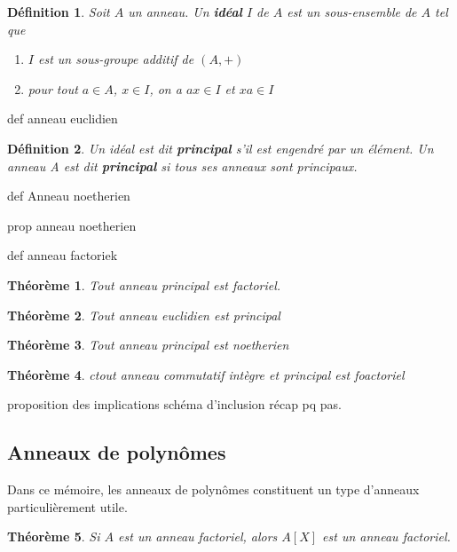 \documentclass[a4paper,12pt]{report}  %
\theoremstyle{definitionstyle}
\newtheorem{definition}{Définition}[chapter] %
\theoremstyle{examplestyle}
\theoremstyle{remarkstyle}
\theoremstyle{propositionstyle}
\theoremstyle{theoremstyle}
\newtheorem{theoreme}{Théorème}[chapter]  %
\theoremstyle{proofstyle}
\begin{document}
	\begin{definition}
		Soit $A$ un anneau. Un \textbf{idéal} $I$ de $A$ est un sous-ensemble de $A$ tel que
		\begin{enumerate}
			\item $I$ est un sous-groupe additif de $(A, +)$
			\item pour tout $a \in A$, $x \in I$, on a $ax \in I$ et $xa \in I$
		\end{enumerate}
	\end{definition}

	def anneau euclidien
	
	\begin{definition}
		Un idéal est dit \textbf{principal} s'il est engendré par un élément. Un anneau A est dit \textbf{principal} si tous ses anneaux sont principaux.
	\end{definition} 
	
		

	def Anneau noetherien
	
	prop anneau noetherien
	
	
	def anneau factoriek
	
	\begin{theoreme}
		Tout anneau principal est factoriel.
	\end{theoreme}
	
	
	\begin{theoreme}
		Tout anneau euclidien est principal
	\end{theoreme}
	
	\begin{theoreme}
		Tout anneau principal est noetherien
	\end{theoreme}
	
	
	\begin{theoreme}
		ctout anneau commutatif intègre et principal est foactoriel
	\end{theoreme}
	
	
	

	
	
	proposition des implications
	schéma d'inclusion récap pq pas.
	
	\subsection{Anneaux de polynômes}
	
	Dans ce mémoire, les anneaux de polynômes constituent un type d'anneaux particulièrement utile.
	
	\begin{theoreme}
	Si $A$ est un anneau factoriel, alors $A[X]$ est un anneau factoriel.
	\end{theoreme}
\end{document}
